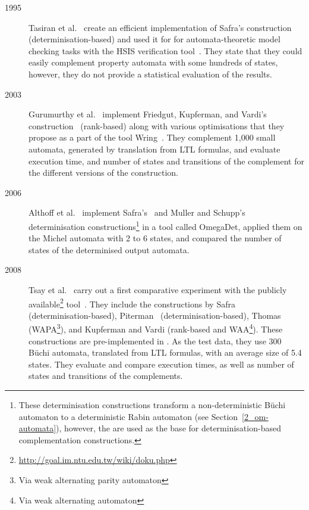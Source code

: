{
\begin{description}
\item[1995] Tasiran et al.~\cite{1995_tasiran} create an efficient implementation of Safra's construction\cite{1988_safra_2} (determinisation-based) and used it for for automata-theoretic model checking tasks with the HSIS verification tool~\cite{1994_hsis}. They state that they could easily complement property automata with some hundreds of states, however, they do not provide a statistical evaluation of the results.

\item[2003] Gurumurthy et al.~\cite{2003_Gurumurthy} implement Friedgut, Kupferman, and Vardi's construction~\cite{Kupferman:2001} (rank-based) along with various optimisations that they propose as a part of the tool Wring~\cite{somenzi2000efficient}. They complement 1,000 small automata, generated by translation from LTL formulas, and evaluate execution time, and number of states and transitions of the complement for the different versions of the construction.

\item[2006] Althoff et al.~\cite{2006_althoff} implement Safra's~\cite{1988_safra_2} and Muller and Schupp's~\cite{Muller199569} determinisation constructions\footnote{These determinisation constructions transform a non-deterministic Büchi automaton to a deterministic Rabin automaton (see Section~\ref{2_om-automata}), however, the are used as the base for determinisation-based complementation constructions.} in a tool called OmegaDet, applied them on the Michel automata with 2 to 6 states, and compared the number of states of the determinised output automata.

\item[2008] Tsay et al.~\cite{2008_goal_ext} carry out a first comparative experiment with the publicly available\footnote{\url{http://goal.im.ntu.edu.tw/wiki/doku.php}} \goal{} tool~\cite{2007_goal,2008_goal_ext,2009_goal,2013_goal}. They include the constructions by Safra~\cite{1988_safra_2} (determinisation-based), Piterman~\cite{2007_piterman} (determinisation-based), Thomas~\cite{1999_thomas} (WAPA\footnote{Via weak alternating parity automaton}), and Kupferman and Vardi\cite{Kupferman:2001} (rank-based and WAA\footnote{Via weak alternating automaton}). These constructions are pre-implemented in \goal. As the test data, they use 300 Büchi automata, translated from LTL formulas, with an average size of 5.4 states. They evaluate and compare execution times, as well as number of states and transitions of the complements.


\end{description}}
